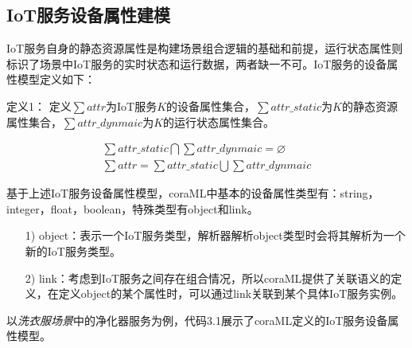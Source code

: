 \documentclass[winfonts,master,twoside]{njuthesis}
\begin{document}
\subsection{IoT服务设备属性建模}
IoT服务自身的静态资源属性是构建场景组合逻辑的基础和前提，运行状态属性则标识了场景中IoT服务的实时状态和运行数据，两者缺一不可。IoT服务的设备属性模型定义如下：

定义1： 定义$\sum attr$为IoT服务$K$的设备属性集合，$\sum attr\_static$为$K$的静态资源属性集合，$\sum attr\_dynmaic$为$K$的运行状态属性集合。

\begin{align}
\sum attr\_static \bigcap \sum attr\_dynmaic = \varnothing \label{1} \\
\sum attr = \sum attr\_static \bigcup \sum attr\_dynmaic   \label{2}
\end{align}


基于上述IoT服务设备属性模型，coraML中基本的设备属性类型有：string，integer，float，boolean，特殊类型有object和link。
\begin{itemize}
  \item [1)] 
  object：表示一个IoT服务类型，解析器解析object类型时会将其解析为一个新的IoT服务类型。 
  \item [2)]
  link：考虑到IoT服务之间存在组合情况，所以coraML提供了关联语义的定义，在定义object的某个属性时，可以通过link关联到某个具体IoT服务实例。
\end{itemize}
以\textit{洗衣服场景}中的净化器服务为例，代码3.1展示了coraML定义的IoT服务设备属性模型。

\end{document}
